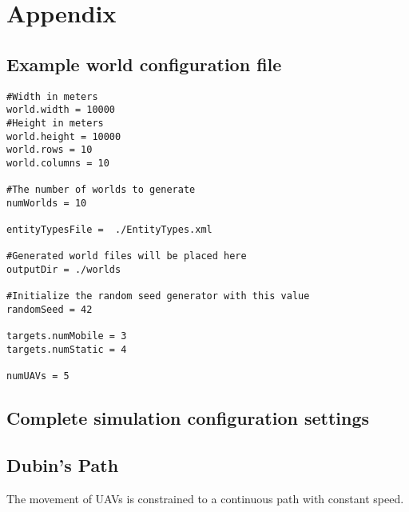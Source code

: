 \chapter{Appendix}


\section{Example world configuration file}
\label{sec:exampleWorldCfg}
\begin{verbatim}
#Width in meters
world.width = 10000
#Height in meters
world.height = 10000
world.rows = 10
world.columns = 10

#The number of worlds to generate
numWorlds = 10

entityTypesFile =  ./EntityTypes.xml

#Generated world files will be placed here
outputDir = ./worlds

#Initialize the random seed generator with this value
randomSeed = 42

targets.numMobile = 3
targets.numStatic = 4

numUAVs = 5
\end{verbatim}


\section{Complete simulation configuration settings}

\section{Dubin's Path} \label{sec:dubin}
The movement of UAVs is constrained to a continuous path with constant speed.